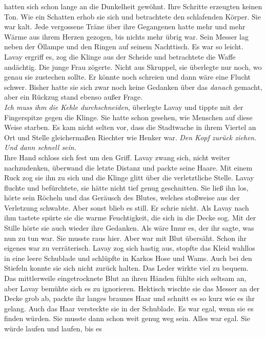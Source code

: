 hatten sich schon lange an die Dunkelheit gewöhnt. Ihre Schritte erzeugten keinen Ton. Wie ein 
Schatten erhob sie sich und betrachtete den schlafenden Körper. Sie war kalt. Jede vergossene Träne 
über ihre Gegangenen hatte mehr und mehr Wärme aus ihrem Herzen gezogen, bis nichts mehr übrig 
war. Sein Messer lag neben der Öllampe und den Ringen auf seinem Nachttisch. Es war so leicht.\\
Lavay ergriff es, zog die Klinge aus der Scheide und betrachtete die Waffe andächtig. Die junge 
Frau zögerte. Nicht aus Skruppel, sie überlegte nur noch, wo genau sie zustechen sollte. Er könnte 
noch schreien und dann wäre eine Flucht schwer. Bisher hatte sie sich zwar noch keine Gedanken über 
das \textit{danach} gemacht, aber ein Rückzug stand ebenso außer Frage.\\
\textit{Ich muss ihm die Kehle durchschneiden}, überlegte Lavay und tippte mit der Fingerspitze 
gegen die Klinge. Sie hatte schon gesehen, wie Menschen auf diese Weise starben. Es kam nicht 
selten vor, dass die Stadtwache in ihrem Viertel an Ort und Stelle gleichermaßen Riechter wie Henker 
war. \textit{Den Kopf zurück ziehen. Und dann schnell sein.}\\
Ihre Hand schloss sich fest um den Griff. Lavay zwang sich, nicht weiter nachzudenken, überwand die 
letzte Distanz und packte seine Haare. Mit einem Ruck zog sie ihn zu sich und die Klinge glitt über 
die verletztliche Stelle. Lavay fluchte und befürchtete, sie hätte nicht tief genug geschnitten. 
Sie ließ ihn los, hörte sein Röcheln und das Geräusch des Blutes, welches stoßweise aus der 
Verletzung schwabte. Aber sonst blieb es still. Er schrie nicht. Als Lavay nach ihm tastete spürte 
sie die warme Feuchtigkeit, die sich in die Decke sog. Mit der Stille hörte sie auch wieder ihre 
Gedanken. Als wäre Imur es, der ihr sagte, was nun zu tun war. Sie musste raus hier. Aber war mit 
Blut übersäht. Schon ihr eigenes war zu verräterisch. Lavay zog sich hastig aus, stopfte das Kleid 
wahllos in eine leere Schublade und schlüpfte in Karkos Hose und Wams. Auch bei den Stiefeln konnte 
sie sich nicht zurück halten. Das Leder wirkte viel zu bequem. Das mittlerweile eingetrocknete Blut 
an ihren Händen fühlte sich seltsam an, aber Lavay bemühte sich es zu ignorieren. Hektisch wischte 
sie das Messer an der Decke grob ab, packte ihr langes braunes Haar und schnitt es so kurz wie es 
ihr gelang. Auch das Haar versteckte sie in der Schublade. Es war egal, wenn sie es finden würden. 
Sie musste dann schon weit genug weg sein. Alles war egal. Sie würde laufen und laufen, bis es 
